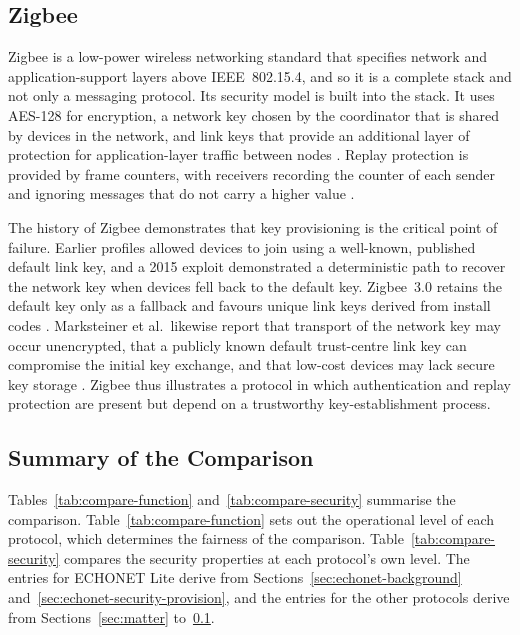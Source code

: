 \subsection{Zigbee}
\label{sec:zigbee}

Zigbee is a low-power wireless networking standard that specifies network and application-support layers above IEEE~802.15.4, and so it is a complete stack and not only a messaging protocol. Its security model is built into the stack. It uses AES-128 for encryption, a network key chosen by the coordinator that is shared by devices in the network, and link keys that provide an additional layer of protection for application-layer traffic between nodes \cite{SiliconLabsZigbee}. Replay protection is provided by frame counters, with receivers recording the counter of each sender and ignoring messages that do not carry a higher value \cite{SiliconLabsZigbee,Marksteiner2017}.

The history of Zigbee demonstrates that key provisioning is the critical point of failure. Earlier profiles allowed devices to join using a well-known, published default link key, and a 2015 exploit demonstrated a deterministic path to recover the network key when devices fell back to the default key. Zigbee~3.0 retains the default key only as a fallback and favours unique link keys derived from install codes \cite{SiliconLabsZigbee}. Marksteiner et al.\ likewise report that transport of the network key may occur unencrypted, that a publicly known default trust-centre link key can compromise the initial key exchange, and that low-cost devices may lack secure key storage \cite{Marksteiner2017}. Zigbee thus illustrates a protocol in which authentication and replay protection are present but depend on a trustworthy key-establishment process.

\subsection{Summary of the Comparison}
\label{sec:comparison-summary}

Tables~\ref{tab:compare-function} and~\ref{tab:compare-security} summarise the comparison. Table~\ref{tab:compare-function} sets out the operational level of each protocol, which determines the fairness of the comparison. Table~\ref{tab:compare-security} compares the security properties at each protocol's own level. The entries for ECHONET Lite derive from Sections~\ref{sec:echonet-background} and~\ref{sec:echonet-security-provision}, and the entries for the other protocols derive from Sections~\ref{sec:matter} to~\ref{sec:zigbee}.

